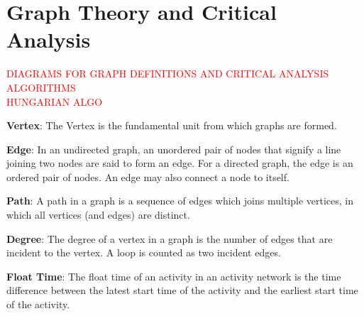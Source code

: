 %
%
%




\section{Graph Theory and Critical Analysis} \label{Module1:GraphTheoryCriticalAnalysis}

\textcolor{red} {DIAGRAMS FOR GRAPH DEFINITIONS  AND CRITICAL ANALYSIS ALGORITHMS}\\
\textcolor{red}{HUNGARIAN ALGO}
\begin{defn}\label{mod1:defn:Vertex}
   \textbf{Vertex}: The Vertex is the fundamental unit from which graphs are formed.
\end{defn}

\begin{defn}\label{mod1:defn:Edge}
   \textbf{Edge}: In an undirected graph, an unordered pair of nodes that signify  a line joining  two nodes are said to form an edge. For a directed graph, the edge is an ordered pair of nodes. An edge may also connect a node to itself.
\end{defn}

\begin{defn}\label{mod1:defn:Path}
    \textbf{Path}: A path in a graph is a sequence of edges which joins multiple vertices, in which all vertices (and edges) are distinct.
\end{defn}

\begin{defn}\label{mod1:defn:Degree}
   \textbf{Degree}: The degree of a vertex  in a graph is the number of edges that are incident to the vertex. A loop is counted as two incident edges.
\end{defn}

\begin{defn}\label{mod1:defn:FloatTime}
	\textbf{Float Time}: The float time of an activity in an activity network is the time difference between the latest start time of the activity and the earliest start time of the activity.
\end{defn}
	

